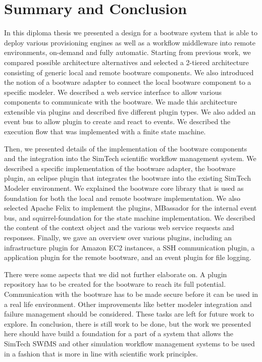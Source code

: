 \chapter{Summary and Conclusion}
\label{conclusion}

In this diploma thesis we presented a design for a bootware system that is able to deploy various provisioning engines as well as a workflow middleware into remote environments, on-demand and fully automatic.
Starting from previous work, we compared possible architecture alternatives and selected a 2-tiered architecture consisting of generic local and remote bootware components.
We also introduced the notion of a bootware adapter to connect the local bootware component to a specific modeler.
We described a web service interface to allow various components to communicate with the bootware.
We made this architecture extensible via plugins and described five different plugin types.
We also added an event bus to allow plugin to create and react to events.
We described the execution flow that was implemented with a finite state machine.

Then, we presented details of the implementation of the bootware components and the integration into the SimTech scientific workflow management system.
We described a specific implementation of the bootware adapter, the bootware plugin, an eclipse plugin that integrates the bootware into the existing SimTech Modeler environment.
We explained the bootware core library that is used as foundation for both the local and remote bootware implementation.
We also selected Apache Felix to implement the plugins, MBassador for the internal event bus, and squirrel-foundation for the state machine implementation.
We described the content of the context object and the various web service requests and responses.
Finally, we gave an overview over various plugins, including an infrastructure plugin for Amazon EC2 instances, a SSH communication plugin, a application plugin for the remote bootware, and an event plugin for file logging.

There were some aspects that we did not further elaborate on.
A plugin repository has to be created for the bootware to reach its full potential.
Communication with the bootware has to be made secure before it can be used in a real life environment.
Other improvements like better modeler integration and failure management should be considered.
These tasks are left for future work to explore.
In conclusion, there is still work to be done, but the work we presented here should have build a foundation for a part of a system that allows the SimTech SWfMS and other simulation workflow management systems to be used in a fashion that is more in line with scientific work principles.
